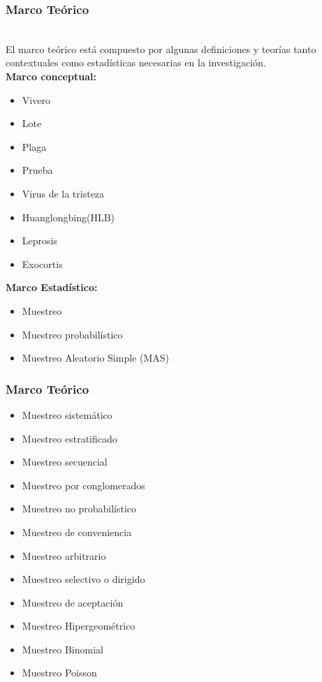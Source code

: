 \documentclass[11pt]{beamer}
\begin{document}
\begin{frame}
\frametitle{Marco Teórico}
~\\El marco teórico está compuesto por algunas definiciones y teorías tanto contextuales como estadísticas necesarias en la investigación.
~\\\textbf{Marco conceptual:}
\begin{itemize}
\item Vivero
\item Lote
\item Plaga
\item Prueba
\item Virus de la tristeza
\item Huanglongbing(HLB)
\item Leprosis
\item Exocortis
\end{itemize}
\textbf{Marco Estadístico:}
\begin{itemize}
\item Muestreo
\item Muestreo probabilístico
\item Muestreo Aleatorio Simple (MAS)
\end{itemize}
\end{frame}

\begin{frame}
\frametitle{Marco Teórico}
\begin{itemize}
\item Muestreo sistemático
\item Muestreo estratificado
\item Muestreo secuencial
\item Muestreo por conglomerados
\item Muestreo no probabilístico
\item Muestreo de conveniencia
\item Muestreo arbitrario
\item Muestreo selectivo o dirigido
\item Muestreo de aceptación
\item Muestreo Hipergeométrico
\item Muestreo Binomial
\item Muestreo Poisson
\end{itemize}
\end{frame}
\end{document}
